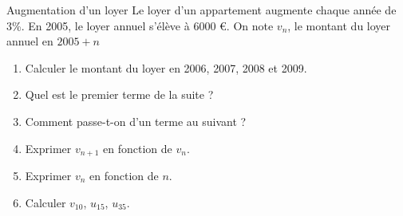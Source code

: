 \begin{myact}{Augmentation d'un loyer}
	Le loyer d'un appartement augmente chaque année de 3\%. En 2005, le loyer annuel s'élève à 6000 €.
	On note $v_n$, le montant du loyer annuel en $2005 + n$
	
	\begin{enumerate}
		\item Calculer le montant du loyer en 2006, 2007, 2008 et 2009.
		\item Quel est le premier terme de la suite ?
		\item Comment passe-t-on d'un terme au suivant ?
		\item Exprimer $v_{n+1}$ en fonction de $v_n$.
		\item Exprimer $v_n$ en fonction de $n$.
		\item Calculer $v_{10}$, $u_{15}$, $u_{35}$.
	\end{enumerate}
	
\end{myact}